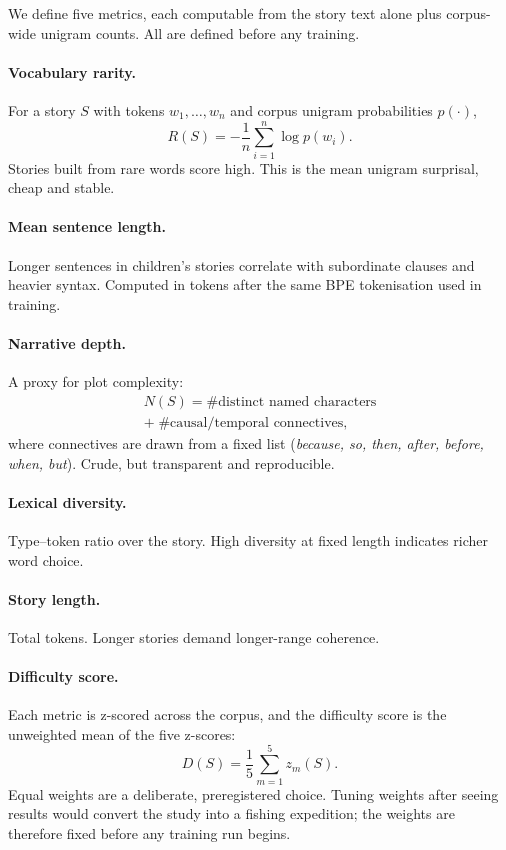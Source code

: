We define five metrics, each computable from the story text alone plus
corpus-wide unigram counts. All are defined before any training.

\paragraph{Vocabulary rarity.} For a story $S$ with tokens $w_1, \dots,
w_n$ and corpus unigram probabilities $p(\cdot)$,
{\small
\begin{equation}
R(S) = -\frac{1}{n}\sum_{i=1}^{n} \log p(w_i).
\end{equation}}
Stories built from rare words score high. This is the mean unigram
surprisal, cheap and stable.

\paragraph{Mean sentence length.} Longer sentences in children's stories
correlate with subordinate clauses and heavier syntax. Computed in
tokens after the same BPE tokenisation used in training.

\paragraph{Narrative depth.} A proxy for plot complexity:
{\small
\begin{equation}
\begin{aligned}
N(S) = \#\text{distinct named characters} \\
+\; \#\text{causal/temporal connectives},
\end{aligned}
\end{equation}}
where connectives are drawn from a fixed list (\emph{because, so, then,
after, before, when, but}). Crude, but transparent and reproducible.

\paragraph{Lexical diversity.} Type--token ratio over the story. High
diversity at fixed length indicates richer word choice.

\paragraph{Story length.} Total tokens. Longer stories demand longer-range
coherence.

\paragraph{Difficulty score.} Each metric is z-scored across the corpus,
and the difficulty score is the unweighted mean of the five z-scores:
\begin{equation}
D(S) = \frac{1}{5}\sum_{m=1}^{5} z_m(S).
\end{equation}
Equal weights are a deliberate, preregistered choice. Tuning weights
after seeing results would convert the study into a fishing expedition;
the weights are therefore fixed before any training run begins.

